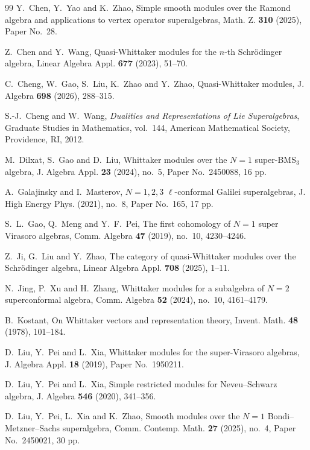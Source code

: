 \documentclass[12pt,reqno]{article}
\begin{document}
\begin{thebibliography}{99}
 Y.~Chen, Y.~Yao and K.~Zhao, Simple smooth modules over the Ramond algebra and applications to vertex operator superalgebras, Math. Z. {\bf 310} (2025), Paper No.~28.

 Z.~Chen and Y.~Wang, Quasi-Whittaker modules for the $n$-th Schr\"odinger algebra, Linear Algebra Appl. {\bf 677} (2023), 51--70.

 C.~Cheng, W.~Gao, S.~Liu, K.~Zhao and Y.~Zhao, Quasi-Whittaker modules, J. Algebra {\bf 698} (2026), 288--315.

 S.-J.~Cheng and W.~Wang, \emph{Dualities and Representations of Lie Superalgebras}, Graduate Studies in Mathematics, vol.~144, American Mathematical Society, Providence, RI, 2012.

 M.~Dilxat, S.~Gao and D.~Liu, Whittaker modules over the $N=1$ super-BMS$_3$ algebra, J. Algebra Appl. {\bf 23} (2024), no.~5, Paper No.~2450088, 16 pp.

 A.~Galajinsky and I.~Masterov, $N=1,2,3$ $\ell$-conformal Galilei superalgebras, J. High Energy Phys. (2021), no.~8, Paper No.~165, 17 pp.

 S.~L.~Gao, Q.~Meng and Y.~F.~Pei, The first cohomology of $N=1$ super Virasoro algebras, Comm. Algebra {\bf 47} (2019), no.~10, 4230--4246.

 Z.~Ji, G.~Liu and Y.~Zhao, The category of quasi-Whittaker modules over the Schr\"odinger algebra, Linear Algebra Appl. {\bf 708} (2025), 1--11.

 N.~Jing, P.~Xu and H.~Zhang, Whittaker modules for a subalgebra of $N=2$ superconformal algebra, Comm. Algebra {\bf 52} (2024), no.~10, 4161--4179.

 B.~Kostant, On Whittaker vectors and representation theory, Invent. Math. {\bf 48} (1978), 101--184.

 D.~Liu, Y.~Pei and L.~Xia, Whittaker modules for the super-Virasoro algebras, J. Algebra Appl. {\bf 18} (2019), Paper No.~1950211.

 D.~Liu, Y.~Pei and L.~Xia, Simple restricted modules for Neveu--Schwarz algebra, J. Algebra {\bf 546} (2020), 341--356.

D.~Liu, Y.~Pei, L.~Xia and K.~Zhao, Smooth modules over the $N=1$ Bondi--Metzner--Sachs superalgebra, Comm. Contemp. Math. {\bf 27} (2025), no.~4, Paper No.~2450021, 30 pp.


\end{thebibliography}
\end{document}
